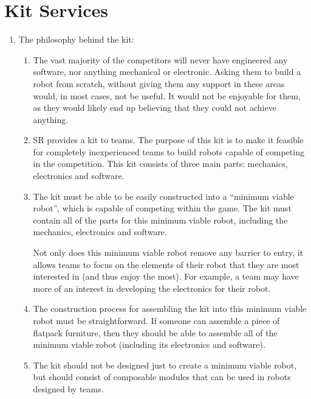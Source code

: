 \section{Kit Services}

\begin{enumerate}

\item The philosophy behind the kit:

  \begin{enumerate}

    \item The vast majority of the competitors will never have engineered any software, nor anything mechanical or electronic.  Asking them to build a robot from scratch, without giving them any support in these areas would, in most cases, not be useful.  It would not be enjoyable for them, as they would likely end up believing that they could not achieve anything.

    \item SR provides a kit to teams.  The purpose of this kit is to make it feasible for completely inexperienced teams to build robots capable of competing in the competition.  This kit consists of three main parts: mechanics, electronics and software.

    \item The kit must be able to be easily constructed into a ``minimum viable robot'', which is capable of competing within the game.  The kit must contain all of the parts for this minimum viable robot, including the mechanics, electronics and software.

Not only does this minimum viable robot remove any barrier to entry, it allows teams to focus on the elements of their robot that they are most interested in (and thus enjoy the most).  For example, a team may have more of an interest in developing the electronics for their robot.
      
    \item The construction process for assembling the kit into this minimum viable robot must be straightforward.  If someone can assemble a piece of flatpack furniture, then they should be able to assemble all of the minimum viable robot (including its electronics and software).

    \item The kit should not be designed just to create a minimum viable robot, but should consist of composable modules that can be used in robots designed by teams.  


\end{enumerate}
\end{enumerate}
